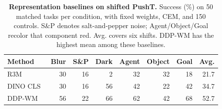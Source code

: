 \begin{table}[t]
\centering
\caption{\textbf{Representation baselines on shifted PushT.} Success (\%) on 50 matched tasks per condition, with fixed weights, CEM, and 150 controls. S\&P denotes salt-and-pepper noise; Agent/Object/Goal recolor that component red. Avg. covers six shifts. DDP-WM has the highest mean among these baselines.}
\label{tab:extra-baselines}
\small\setlength{\tabcolsep}{2pt}
\begin{tabular}{lrrrrrrr}
\toprule
Method & Blur & S\&P & Dark & Agent & Object & Goal & Avg.\\
\midrule
R3M~\cite{nair2022r3m} &30&16&2&32&32&18&21.7\\
DINO CLS~\cite{oquab2024dinov2} &30&16&56&42&22&42&34.7\\
DDP-WM~\cite{yin2026ddpwm} &56&22&66&62&42&68&52.7\\
\bottomrule
\end{tabular}
\end{table}
